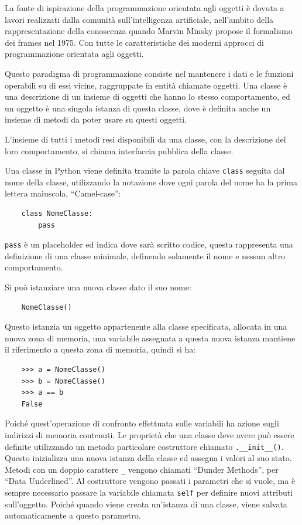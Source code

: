 \documentclass{article}
\numberwithin{equation}{subsection}
\begin{document}
La fonte di ispirazione della programmazione orientata agli oggetti è dovuta a lavori realizzati dalla comunità 
sull'intelligenza artificiale, nell'ambito della rappresentazione della conoscenza quando Marvin Minsky propose il 
formalismo dei frames nel 1975. Con tutte le caratteristiche dei moderni approcci di programmazione orientata agli 
oggetti. 

Questo paradigma di programmazione consiste nel mantenere i dati e le funzioni operabili su di essi vicine, raggruppate 
in entità chiamate oggetti. Una classe è una descrizione di un insieme di oggetti che hanno lo stesso comportamento, ed un 
oggetto è una singola istanza di questa classe, dove è definita anche un insieme di metodi da poter usare su questi oggetti. 

L'insieme di tutti i metodi resi disponibili da una classe, con la descrizione del loro comportamento, si chiama interfaccia 
pubblica della classe. 

Una classe in Python viene definita tramite la parola chiave \verb|class| seguita dal nome della classe, utilizzando 
la notazione dove ogni parola del nome ha la prima lettera maiuscola, ``Camel-case'':
\begin{verbatim}
    class NomeClasse:
        pass 
\end{verbatim}

\verb|pass| è un placeholder ed indica dove sarà scritto codice, questa rappresenta una definizione di una classe minimale, 
definendo solamente il nome e nessun altro comportamento. 

Si può istanziare una nuova classe dato il suo nome: 
\begin{verbatim}
    NomeClasse()
\end{verbatim}
Questo istanzia un oggetto appartenente alla classe specificata, allocata in una nuova zona di memoria, una variabile 
assegnata a questa nuova istanza mantiene il riferimento a questa zona di memoria, quindi si ha:
\begin{verbatim}
    >>> a = NomeClasse()
    >>> b = NomeClasse()
    >>> a == b
    False
\end{verbatim}
Poiché quest'operazione di confronto effettuata sulle variabili ha azione sugli indirizzi di memoria contenuti. 
Le proprietà che una classe deve avere può essere definite utilizzando un metodo particolare costruttore chiamato \verb|.__init__()|. 
Questo inizializza una nuova istanza della classe ed assegna i valori al suo stato. Metodi con un doppio carattere \verb|_| 
vengono chiamati ``Dunder Methods'', per ``Data Underlined''. Al costruttore vengono passati i parametri che si vuole, ma 
è sempre necessario passare la variabile chiamata \verb|self| per definire nuovi attributi sull'oggetto. Poiché quando viene 
creata un'istanza di una classe, viene salvata automaticamente a questo parametro. 
\end{document}
